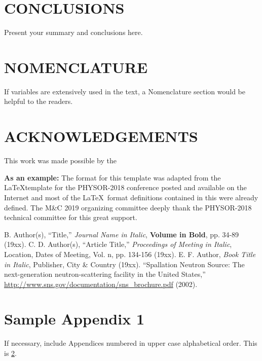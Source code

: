 \documentclass[letterpaper]{mandc2019}
\begin{document}
\section{CONCLUSIONS}

Present your summary and conclusions here.

\section*{NOMENCLATURE}

If variables are extensively used in the text, a Nomenclature section would be helpful to the readers.

\section*{ACKNOWLEDGEMENTS}

This work was made possible by the 

\textbf{As an example:} The format for this template was adapted from the \LaTeX template for the PHYSOR-2018 conference posted and available on the Internet and 
most of the \LaTeX\ format definitions contained in this were already defined. The 
M\&C 2019 organizing committee deeply thank the PHYSOR-2018 technical committee 
for this great support.

% 
% 

\setlength{\baselineskip}{12pt}
\begin{thebibliography}{300}
 B. Author(s), ``Title,'' \emph{Journal Name in Italic}, 
  \textbf{Volume in Bold}, pp. 34-89 (19xx).
 C. D. Author(s), ``Article Title,'' \emph{Proceedings of
  Meeting in Italic}, Location, Dates of Meeting, Vol. n, pp. 134-156 
  (19xx).
 E. F. Author, \emph{Book Title in Italic}, Publisher, City \&
  Country (19xx). 
 ``Spallation Neutron Source: The next-generation 
  neutron-scattering facility in the United States,'' 
  \url{http://www.sns.gov/documentation/sns\_brochure.pdf} (2002).
\end{thebibliography}

\appendix
\gdef\thesection{APPENDIX \Alph{section}}
\section{Sample Appendix 1}
\label{app:a}
If necessary, include Appendices numbered in upper case alphabetical order. This is \ref{app:a}. 
\end{document}
